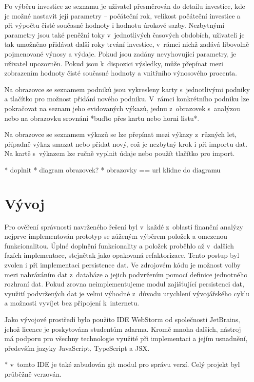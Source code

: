 Po výběru investice ze seznamu je uživatel přesměrován do detailu investice, kde je možné nastavit její parametry -- počáteční rok, velikost počáteční investice a při výpočtu čisté současné hodnoty i hodnotu úrokové sazby. Nezbytnými parametry jsou také peněžní toky v~jednotlivých časových obdobích, uživateli je tak umožněno přidávat další roky trvání investice, v~rámci nichž zadává libovolně pojmenované výnosy a výdaje. Pokud jsou zadány nevyhovující parametry, je uživatel upozorněn. Pokud jsou k~dispozici výsledky, může přepínat mezi zobrazením hodnoty čisté současné hodnoty a vnitřního výnosového procenta.

Na obrazovce se seznamem podniků jsou vykresleny karty s~jednotlivými podniky a tlačítko pro možnost přidání nového podniku. V~rámci konkrétního podniku lze pokračovat na seznam jeho evidovaných výkazů, jednu z~obrazovek s~analýzou nebo na obrazovku srovnání *buďto přes kartu nebo horni listu*. 

Na obrazovce se seznamem výkazů se lze přepínat mezi výkazy z~různých let, případně výkaz smazat nebo přidat nový, což je nezbytný krok i při importu dat. Na kartě s~výkazem lze ručně vyplnit údaje nebo použít tlačítko pro import.

* doplnit
* diagram obrazovek?
* obrazovky == url klidne do diagramu

\section{Vývoj}
Pro ověření správnosti navrženého řešení byl v~každé z~oblastí finanční analýzy nejprve implementován prototyp se zúženým výběrem položek a omezenou funkcionalitou. Úplné doplnění funkcionality a položek proběhlo až v~dalších fazích implementace, stejnětak jako opakovaná refaktorizace. Tento postup byl zvolen i při implementaci persistence dat. Ve zdrojovém kódu je možnost volby mezi nahráváním dat z~databáze a jejich podvržením pomocí definice jednotného rozhraní dat. Pokud zrovna neimplementujeme modul zajišťující persistenci dat, využití podvržených dat je velmi výhodné z~důvodu urychlení vývojářského cyklu a možnosti vyvíjet bez připojení k~internetu.

Jako vývojové prostředí bylo použito IDE WebStorm od společnosti JetBrains, jehož licence je poskytována studentům zdarma. Kromě mnoha dalších, nástroj má podporu pro všechny technologie využité při implementaci a jejím usnadnění, především jazyky JavaScript, TypeScript a JSX.

* v~tomto IDE je také zabudován git modul pro správu verzí. Celý projekt byl průběžně verzován.

